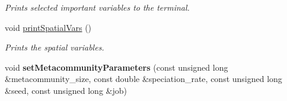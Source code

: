 \begin{DoxyCompactItemize}
\begin{DoxyCompactList}\small\item\em Prints selected important variables to the terminal. \end{DoxyCompactList}\item 
void \hyperlink{struct_sim_parameters_a04636fc2b0899400011b54bb1f175eb0}{print\+Spatial\+Vars} ()\hypertarget{struct_sim_parameters_a04636fc2b0899400011b54bb1f175eb0}{}\label{struct_sim_parameters_a04636fc2b0899400011b54bb1f175eb0}

\begin{DoxyCompactList}\small\item\em Prints the spatial variables. \end{DoxyCompactList}\item 
void {\bfseries set\+Metacommunity\+Parameters} (const unsigned long \&metacommunity\+\_\+size, const double \&speciation\+\_\+rate, const unsigned long \&seed, const unsigned long \&job)\hypertarget{struct_sim_parameters_a8a245d9aef5595c7d3b4e29e3b1a2ef2}{}\label{struct_sim_parameters_a8a245d9aef5595c7d3b4e29e3b1a2ef2}

\end{DoxyCompactItemize}
